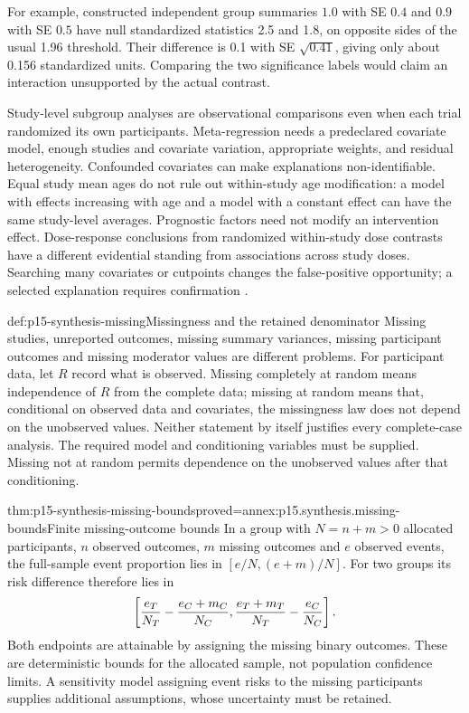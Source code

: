 For example, constructed independent group summaries \(1.0\) with SE
\(0.4\) and \(0.9\) with SE \(0.5\) have null standardized
statistics 2.5 and 1.8, on opposite sides of the usual 1.96 threshold.
Their difference is 0.1 with SE \(\sqrt{0.41}\), giving only about
0.156 standardized units. Comparing the two significance labels would
claim an interaction unsupported by the actual contrast.

Study-level subgroup analyses are observational comparisons even when each
trial randomized its own participants. Meta-regression needs a predeclared
covariate model, enough studies and covariate variation, appropriate weights,
and residual heterogeneity. Confounded covariates can make explanations
non-identifiable. Equal study mean ages do not rule out within-study age
modification: a model with effects increasing with age and a model with a
constant effect can have the same study-level averages. Prognostic factors
need not modify an intervention effect. Dose-response conclusions from
randomized within-study dose contrasts have a different evidential standing
from associations across study doses. Searching many covariates or cutpoints
changes the false-positive opportunity; a selected explanation requires
confirmation \cite[sec.~10.11]{DeeksEtAl2024Cochrane10}.

\begin{hbdefinition}{def:p15-synthesis-missing}{Missingness and the retained denominator}
Missing studies, unreported outcomes, missing summary variances, missing
participant outcomes and missing moderator values are different problems.
For participant data, let \(R\) record what is observed. Missing completely
at random means independence of \(R\) from the complete data; missing at
random means that, conditional on observed data and covariates, the missingness
law does not depend on the unobserved values. Neither statement by itself
justifies every complete-case analysis. The required model and conditioning
variables must be supplied. Missing not at random permits dependence on the
unobserved values after that conditioning.
\end{hbdefinition}

\begin{hbtheorem}{thm:p15-synthesis-missing-bounds}{proved=annex:p15.synthesis.missing-bounds}{Finite missing-outcome bounds}
In a group with \(N=n+m>0\) allocated participants, \(n\) observed
outcomes, \(m\) missing outcomes and \(e\) observed events,
the full-sample event proportion lies in
\([e/N,(e+m)/N]\). For two groups its risk difference therefore lies in
\[
 \left[{e_T\over N_T}-{e_C+m_C\over N_C},
             {e_T+m_T\over N_T}-{e_C\over N_C}\right].
\]
Both endpoints are attainable by assigning the missing binary outcomes.
These are deterministic bounds for the allocated sample, not population
confidence limits. A sensitivity model assigning event risks to the missing
participants supplies additional assumptions, whose uncertainty must be retained.
\end{hbtheorem}

